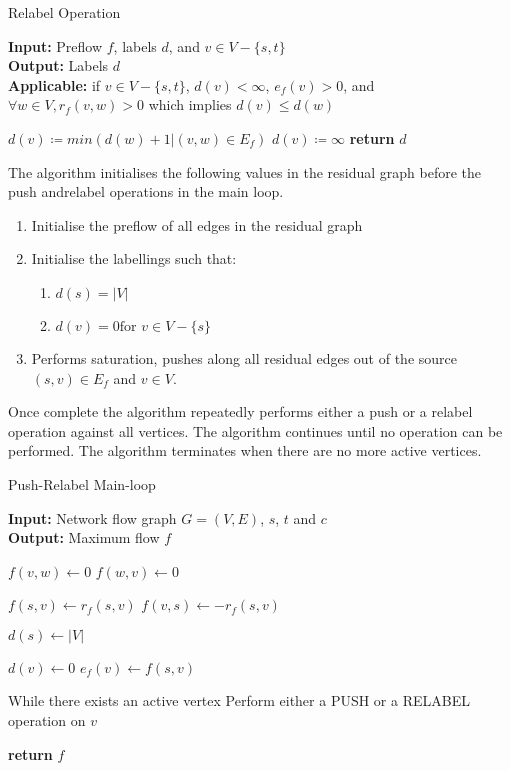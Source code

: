 \begin{algorithm}
	\caption{Relabel Operation}\label{alg:relabel}
	\textbf{Input:} Preflow $f$, labels $d$, and $v \in V-\{s,t\}$\\
	\textbf{Output:} Labels $d$\\
	\textbf{Applicable:} if $v \in V-\{s,t\}$, $d(v) < \infty$, $e_f(v)>0$, and $\forall w \in V, r_f(v,w)>0$ which implies $d(v) \leq d(w)$
	\begin{algorithmic}[1]
		\State $d(v) \coloneqq min(d(w)+1 | (v,w) \in E_f)$
		\Else 
		\State $d(v) \coloneqq \infty$
		\EndIf
		\State \textbf{return} $d$
		\EndProcedure
	\end{algorithmic}
\end{algorithm}

The algorithm initialises the following values in the residual graph before the push andrelabel operations in the main loop.
\begin{enumerate}
	\item Initialise the preflow of all edges in the  residual graph
	
	\item Initialise the labellings such that:
	\begin{enumerate}
		\item $d(s) = |V|$
		\item $d(v) = 0 \text{for } v \in V-\{s\}$
	\end{enumerate}
	
	\item Performs saturation, pushes along all residual edges out of the source $(s,v) \in E_f$ and $v \in V$.
\end{enumerate}
Once complete the algorithm repeatedly performs either a push or a relabel operation against all vertices. The algorithm continues until no operation can be performed. The algorithm terminates when there are no more active vertices.

\begin{algorithm}
	\caption{Push-Relabel Main-loop}\label{alg:main_no_optimisation}
	\textbf{Input:} Network flow graph $G=(V,E)$, $s$, $t$ and $c$\\
	\textbf{Output:} Maximum flow $f$
	\begin{algorithmic}[1]
		\State $f(v,w) \gets 0$
		\State $f(w,v) \gets 0$
		\EndFor
		\item[]
		\State $f(s,v) \gets r_f(s,v)$
		\State $f(v,s) \gets -r_f(s,v)$
		\EndFor
		\item[]
		\State $d(s) \gets |V|$
		\item[]
		\State $d(v) \gets 0$
		\State $e_f(v) \gets f(s,v)$
		\EndFor
		\item[]
		\State While there exists an active vertex
		 
		\State Perform either a PUSH or a RELABEL operation on $v$
		\EndWhile
		\item[]
		\State \textbf{return} $f$
		\EndProcedure
	\end{algorithmic}
\end{algorithm}

